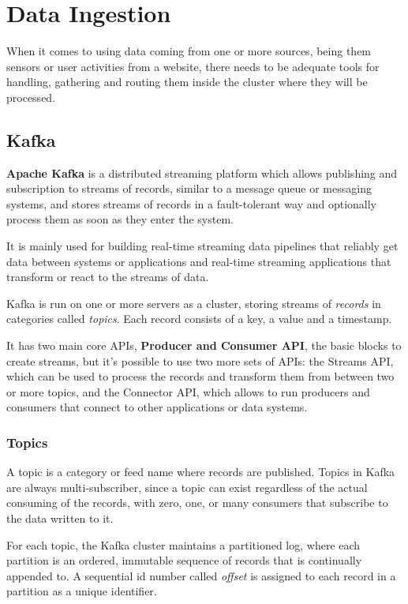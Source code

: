 \chapter{Data Ingestion}

When it comes to using data coming from one or more sources, being them sensors or user activities from a website, there needs to be adequate tools for handling, gathering and routing them inside the cluster where they will be processed.

\section{Kafka}

\textbf{Apache Kafka} \cite{kafka_doc} is a distributed streaming platform which allows publishing and subscription to streams of records, similar to a message queue or messaging systems, and stores streams of records in a fault-tolerant way and optionally process them as soon as they enter the system. 

It is mainly used for building real-time streaming data pipelines that reliably get data between systems or applications and real-time streaming applications that transform or react to the streams of data.

Kafka is run on one or more servers as a cluster, storing streams of \textit{records} in categories called \textit{topics}. Each record consists of a key, a value and a timestamp.

It has two main core APIs, \textbf{Producer and Consumer API}, the basic blocks to create streams, but it's possible to use two more sets of APIs: the Streams API, which can be used to process the records and transform them from between two or more topics, and the Connector API, which allows to run producers and consumers that connect to other applications or data systems.

\subsection{Topics}

A topic is a category or feed name where records are published. Topics in Kafka are always multi-subscriber, since a topic can exist regardless of the actual consuming of the records, with zero, one, or many consumers that subscribe to the data written to it.

For each topic, the Kafka cluster maintains a partitioned log, where each partition is an ordered, immutable sequence of records that is continually appended to. A sequential id number called \textit{offset} is assigned to each record in a partition as a unique identifier.

